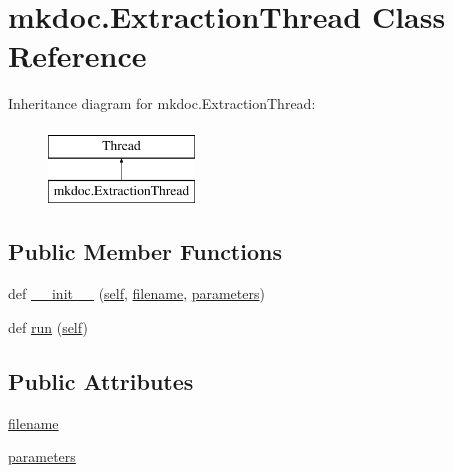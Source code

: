 \hypertarget{classmkdoc_1_1_extraction_thread}{}\section{mkdoc.\+Extraction\+Thread Class Reference}
\label{classmkdoc_1_1_extraction_thread}
Inheritance diagram for mkdoc.\+Extraction\+Thread\+:\begin{figure}[H]
\begin{center}
\leavevmode
\includegraphics[height=2.000000cm]{classmkdoc_1_1_extraction_thread}
\end{center}
\end{figure}
\subsection*{Public Member Functions}
\begin{DoxyCompactItemize}
\item 
def \mbox{\hyperlink{classmkdoc_1_1_extraction_thread_ac7a70320ab2b3417fc87b0f93d20f29f}{\+\_\+\+\_\+init\+\_\+\+\_\+}} (\mbox{\hyperlink{modsupport_8h_a0180ca1808366e5da641475e8bf8cca3}{self}}, \mbox{\hyperlink{classmkdoc_1_1_extraction_thread_a796ad88d5029d4db762583c4b3e95b2b}{filename}}, \mbox{\hyperlink{classmkdoc_1_1_extraction_thread_a277cdba156da8e57176aa7aee0bece1c}{parameters}})
\item 
def \mbox{\hyperlink{classmkdoc_1_1_extraction_thread_af88fe571f38d2fa9b2f1a809d4720de2}{run}} (\mbox{\hyperlink{modsupport_8h_a0180ca1808366e5da641475e8bf8cca3}{self}})
\end{DoxyCompactItemize}
\subsection*{Public Attributes}
\begin{DoxyCompactItemize}
\item 
\mbox{\hyperlink{classmkdoc_1_1_extraction_thread_a796ad88d5029d4db762583c4b3e95b2b}{filename}}
\item 
\mbox{\hyperlink{classmkdoc_1_1_extraction_thread_a277cdba156da8e57176aa7aee0bece1c}{parameters}}
\end{DoxyCompactItemize}


